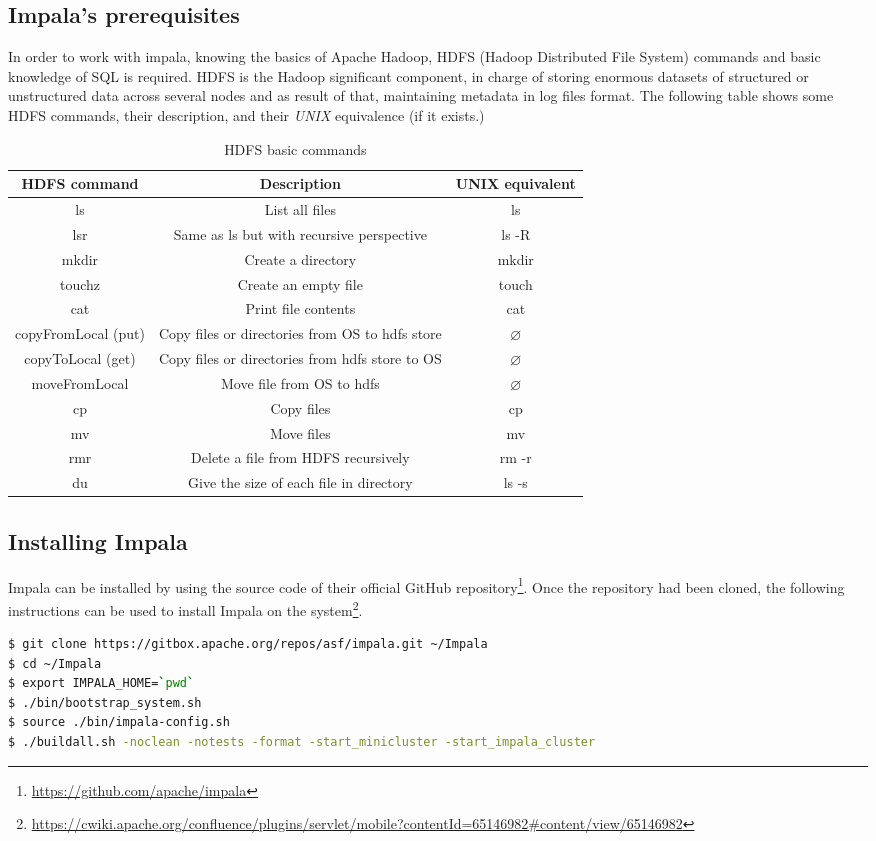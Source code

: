 \documentclass{article}
\newcommand\ita[1]{\textit{#1}}
\begin{document}
\subsection{Impala's prerequisites}
In order to work with impala, knowing the basics of Apache Hadoop, HDFS (Hadoop Distributed File System) commands and basic knowledge of SQL is required. HDFS is the Hadoop significant component, in charge of storing enormous datasets of structured or unstructured data across several nodes and as result of that, maintaining metadata in log files format. The following table shows some HDFS commands, their description, and their \ita{UNIX} equivalence (if it exists.)


\begin{table}[h]
\centering
\begin{tabular}{|c|c|c|}
\hline
HDFS command & Description & UNIX equivalent \\ \hline \hline
ls & List all files & ls \\ \hline
lsr & Same as ls but with recursive perspective & ls -R \\ \hline
mkdir & Create a directory & mkdir \\ \hline
touchz & Create an empty file & touch \\ \hline
cat & Print file contents & cat \\ \hline
copyFromLocal (put) &  Copy files or directories from OS to hdfs store & $\varnothing$ \\ \hline
copyToLocal (get) & Copy files or directories from hdfs store to OS &  $\varnothing$ \\ \hline
moveFromLocal & Move file from OS to hdfs & $\varnothing$ \\ \hline
cp  & Copy files & cp \\ \hline
mv & Move files & mv \\ \hline
rmr & Delete a file from HDFS recursively & rm -r \\ \hline
du & Give the size of each file in directory & ls -s \\ \hline
\end{tabular}
\caption{HDFS basic commands}
\label{table:Table 2}
\end{table}



\subsection{Installing Impala}
Impala can be installed by using the source code of their official GitHub repository\footnote{\url{https://github.com/apache/impala}}.
Once the repository had been cloned, the following instructions can be used to install Impala on the system\footnote{\url{https://cwiki.apache.org/confluence/plugins/servlet/mobile?contentId=65146982\#content/view/65146982}}.
\vspace{0.5cm}
\begin{lstlisting}[language=bash]
$ git clone https://gitbox.apache.org/repos/asf/impala.git ~/Impala
$ cd ~/Impala
$ export IMPALA_HOME=`pwd`
$ ./bin/bootstrap_system.sh
$ source ./bin/impala-config.sh
$ ./buildall.sh -noclean -notests -format -start_minicluster -start_impala_cluster
\end{lstlisting}
\end{document}
